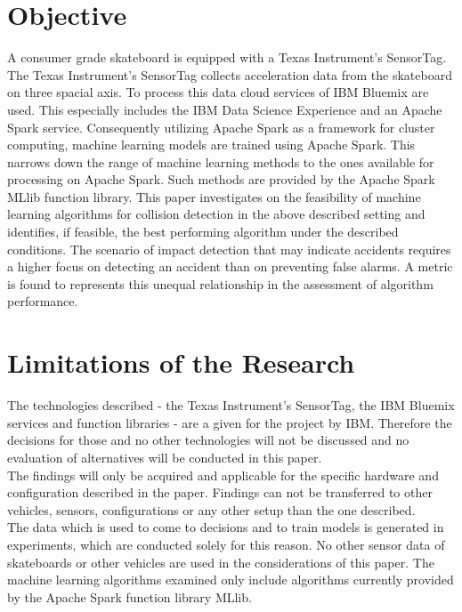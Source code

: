 \section{Objective}
A consumer grade skateboard is equipped with a Texas Instrument’s SensorTag. The Texas Instrument’s SensorTag collects acceleration data from the skateboard on three spacial axis. To process this data cloud services of IBM Bluemix are used. This especially includes the IBM Data Science Experience and an Apache Spark service. Consequently utilizing Apache Spark as a framework for cluster computing, machine learning models are trained using Apache Spark. This narrows down the range of machine learning methods to the ones available for processing on Apache Spark. Such methods are provided by the Apache Spark MLlib function library. 
\newline
This paper investigates on the feasibility of machine learning algorithms for collision detection in the above described setting and identifies, if feasible, the best performing algorithm under the described conditions.   \newline
The  scenario of impact detection that may indicate accidents requires a higher focus on detecting an accident than on preventing false alarms. A metric is found to represents this unequal relationship in the assessment of algorithm performance.

\section{Limitations of the Research}
The technologies described - the Texas Instrument’s SensorTag, the IBM Bluemix services and function libraries - are a given for the project by IBM. Therefore the decisions for those and no other technologies will not be discussed and no evaluation of alternatives will be conducted in this paper.
\\
The findings will only be acquired and applicable for the specific hardware and configuration described in the paper. Findings can not be transferred to other vehicles, sensors, configurations or any other setup than the one described.
\\
The data which is used to come to decisions and to train models is generated in experiments, which are conducted solely for this reason. No other sensor data of skateboards or other vehicles are used in the considerations of this paper.
The machine learning algorithms examined only include algorithms currently provided by the Apache Spark function library MLlib. 

